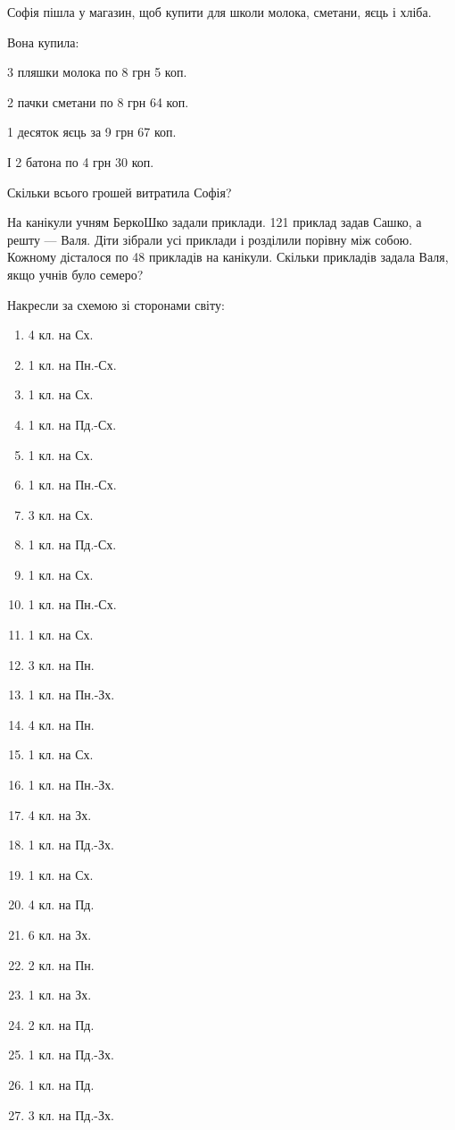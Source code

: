 \problem
Софія пішла у магазин, щоб купити для школи молока, сметани, яєць і хліба.

Вона купила:

3 пляшки молока по 8 грн 5 коп.

2 пачки сметани по 8 грн 64 коп.

1 десяток яєць за 9 грн 67 коп.

І 2 батона по 4 грн 30 коп.

Скільки всього грошей витратила Софія?


\problem
На канікули учням БеркоШко задали приклади.
121 приклад задав Сашко, а решту --- Валя.
Діти зібрали усі приклади і розділили порівну між собою.
Кожному дісталося по 48 прикладів на канікули.
Скільки прикладів задала Валя, якщо учнів було семеро?


\problem
Накресли за схемою зі сторонами світу:
\begin{multicols}{2}
    \begin{enumerate}
        \item 4 кл. на Сх.
        \item 1 кл. на Пн.-Сх.
        \item 1 кл. на Сх.
        \item 1 кл. на Пд.-Сх.
        \item 1 кл. на Сх.
        \item 1 кл. на Пн.-Сх.
        \item 3 кл. на Сх.
        \item 1 кл. на Пд.-Сх.
        \item 1 кл. на Сх.
        \item 1 кл. на Пн.-Сх.
        \item 1 кл. на Сх.
        \item 3 кл. на Пн.
        \item 1 кл. на Пн.-Зх.
        \item 4 кл. на Пн.
        \item 1 кл. на Сх.
        \item 1 кл. на Пн.-Зх.
        \item 4 кл. на Зх.
        \item 1 кл. на Пд.-Зх.
        \item 1 кл. на Сх.
        \item 4 кл. на Пд.
        \item 6 кл. на Зх.
        \item 2 кл. на Пн.
        \item 1 кл. на Зх.
        \item 2 кл. на Пд.
        \item 1 кл. на Пд.-Зх.
        \item 1 кл. на Пд.
        \item 3 кл. на Пд.-Зх.
    \end{enumerate}
\end{multicols}


